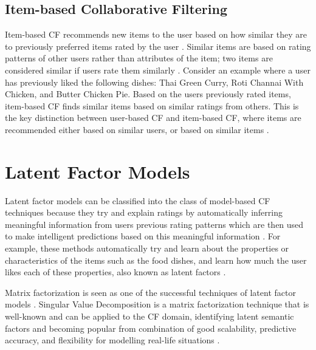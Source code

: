 \subsection{Item-based Collaborative Filtering}

Item-based CF recommends new items to the user based on how similar they are to previously preferred items rated by the user \cite{mahoutaction}. Similar items are based on rating patterns of other users rather than attributes of the item; two items are considered similar if users rate them similarly \cite{schafer2007collaborative}. Consider an example where a user has previously liked the following dishes: Thai Green Curry, Roti Channai With Chicken, and Butter Chicken Pie. Based on the users previously rated items, item-based CF finds similar items based on similar ratings from others. This is the key distinction between user-based CF and item-based CF, where items are recommended either based on similar users, or based on similar items \cite{mahoutaction}.    

\section{Latent Factor Models}


Latent factor models can be classified into the class of model-based CF techniques because they try and explain ratings by automatically inferring meaningful information from users previous rating patterns which are then used to make intelligent predictions based on this meaningful information \cite{survey}. For example, these methods automatically try and learn about the properties or characteristics of the items such as the food dishes, and learn how much the user likes each of these properties, also known as latent factors \cite{koren2011}. 

Matrix factorization is seen as one of the successful techniques of latent factor models \cite{memorybased, koren2009matrix}. Singular Value Decomposition is a matrix factorization technique that is well-known and can be applied to the CF domain, identifying latent semantic factors and becoming popular from combination of good scalability, predictive accuracy, and flexibility for modelling real-life situations \cite{koren2009matrix}. 


